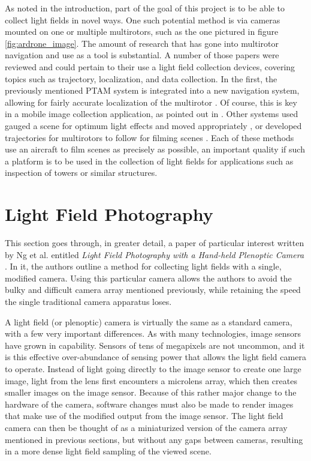 \documentclass[12pt]{report}
\begin{document}
As noted in the introduction, part of the goal of this project is to be able to collect light fields in novel ways. One such potential method is via cameras mounted on one or multiple multirotors, such as the one pictured in figure \ref{fig:ardrone_image}. The amount of research that has gone into multirotor navigation and use as a tool is substantial. A number of those papers were reviewed and could pertain to their use a light field collection devices, covering topics such as trajectory, localization, and data collection. In the first, the previously mentioned PTAM system is integrated into a new navigation system, allowing for fairly accurate localization of the multirotor \cite{Engel12}. Of course, this is key in a mobile image collection application, as pointed out in \cite{Davis12}. Other systems used gauged a scene for optimum light effects and moved appropriately \cite{Srikanth14}, or developed trajectories for multirotors to follow for filming scenes \cite{Roberts16}. Each of these methods use an aircraft to film scenes as precisely as possible, an important quality if such a platform is to be used in the collection of light fields for applications such as inspection of towers or similar structures.

\section{Light Field Photography}
This section goes through, in greater detail, a paper of particular interest written by Ng et al. entitled \emph{Light Field Photography with a Hand-held Plenoptic Camera} \cite{Ng05, Ng06}. In it, the authors outline a method for collecting light fields with a single, modified camera. Using this particular camera allows the authors to avoid the bulky and difficult camera array mentioned previously, while retaining the speed the single traditional camera apparatus loses.

A light field (or plenoptic) camera is virtually the same as a standard camera, with a few very important differences. As with many technologies, image sensors have grown in capability. Sensors of tens of megapixels are not uncommon, and it is this effective over-abundance of sensing power that allows the light field camera to operate. Instead of light going directly to the image sensor to create one large image, light from the lens first encounters a microlens array, which then creates smaller images on the image sensor. Because of this rather major change to the hardware of the camera, software changes must also be made to render images that make use of the modified output from the image sensor. The light field camera can then be thought of as a miniaturized version of the camera array mentioned in previous sections, but without any gaps between cameras, resulting in a more dense light field sampling of the viewed scene.
\end{document}
